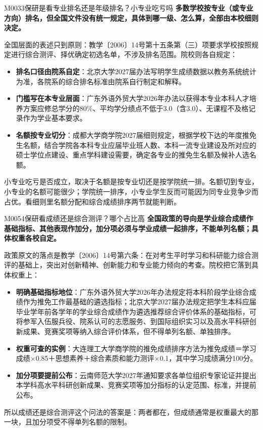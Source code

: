\begin{qa}{M0033}{保研是看专业排名还是年级排名？小专业吃亏吗}
\textbf{多数学校按专业（或专业方向）排名，但全国文件没有统一规定，具体到哪一级、怎么算，全部由本校细则决定。}

全国层面的表述只到原则：教学〔2006〕14号第十五条第（三）项要求学校按照规定进行综合测评、择优确定初选名单，不涉及排名范围。院校则各自规定：

\begin{itemize}
  \item \textbf{排名口径由院系自定}：北京大学2027届办法写明学生成绩数据以教务系统统计为准，各院系的综合排名标准由院系自行制定和解释。
  \item \textbf{门槛写在本专业层面}：广东外语外贸大学2026年办法以获得本专业本科人才培养方案应修总学分的80\%、平均学分绩点不低于3.0（含3.0）、无课程不及格记录作为学业基本要求。
  \item \textbf{名额按专业切分}：成都大学商学院2027届细则规定，根据学校下达的年度推免生名额，结合学院各本科专业应届毕业班人数、本科一流专业建设及所对应的硕士学位点建设、重点学科建设需要，确定各专业的推免生名额及候补人选名额。
\end{itemize}

小专业吃亏是否成立，取决于名额是按专业切还是按学院统一排。名额切到专业，小专业的名额可能很少；学院统一排序，小专业学生反而可能因为同专业竞争少而占优。看细则里名额分配和综合成绩排序两节就能判断。
\end{qa}

\begin{qa}{M0054}{保研看成绩还是综合测评？哪个占比高}
\textbf{全国政策的导向是学业综合成绩作基础指标、其他表现作加分，加分项必须与学业成绩一起排序，不能单列名额；具体权重各校自定。}

政策原文的落点是教学〔2006〕14号第六条：在对考生平时学习和科研能力综合测评的基础上，突出对创新精神、创新能力和专业能力倾向的考查。院校把它落到具体权重上：

\begin{itemize}
  \item \textbf{明确基础指标地位}：广东外语外贸大学2026年办法规定将本科阶段学业综合成绩作为推免工作最基础的遴选指标；北京大学2027届办法规定把学生本科应届毕业学年前各学年的学业综合成绩作为遴选推荐综合评价体系的基础指标，可将参军入伍服兵役、院系认可的志愿服务、到国际组织实习以及高水平科研创新成果、竞赛奖项等纳入综合评价体系，但不得单列名额、单独排序。
  \item \textbf{权重可查的实例}：大连理工大学商学院的推免成绩排序方法为推免成绩＝学习成绩×0.85＋思想素养＋综合素质和能力测评×0.1，其中学习成绩满分100分。
  \item \textbf{加分项要提前公布}：云南师范大学2027年通知要求各单位组织专家论证并提出本学科高水平科研创新成果、竞赛奖项等加分指标的认定范围、标准，并提前公布。
\end{itemize}

所以成绩还是综合测评这个问法的答案是：两者都在，但成绩通常是权重最大的那一块，且加分项受不得单列名额的限制。
\end{qa}

